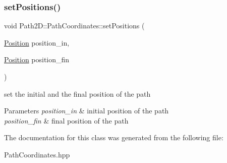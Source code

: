 \subsubsection{\texorpdfstring{set\+Positions()}{setPositions()}}
{\footnotesize\ttfamily void Path2\+D\+::\+Path\+Coordinates\+::set\+Positions (\begin{DoxyParamCaption}\item[{\mbox{\hyperlink{class_path2_d_1_1_element_1_1_position}{Position}}}]{position\+\_\+in,  }\item[{\mbox{\hyperlink{class_path2_d_1_1_element_1_1_position}{Position}}}]{position\+\_\+fin }\end{DoxyParamCaption})}

set the initial and the final position of the path 
\begin{DoxyParams}{Parameters}
{\em position\+\_\+in} & initial position of the path \\
\hline
{\em position\+\_\+fin} & final position of the path \\
\hline
\end{DoxyParams}


The documentation for this class was generated from the following file\+:\begin{DoxyCompactItemize}
\item 
Path\+Coordinates.\+hpp\end{DoxyCompactItemize}
